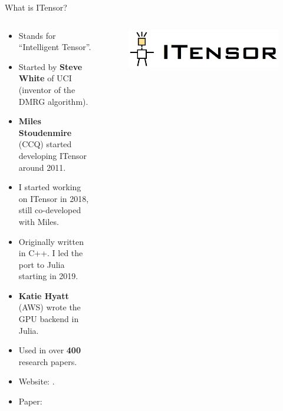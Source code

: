 \begin{frame}{What is ITensor?}

\begin{columns}

  \begin{column}[T]{0.7\textwidth}%

    \begin{itemize}[<+->]

      \item Stands for ``Intelligent Tensor''.
      \item Started by \textbf{Steve White} of UCI (inventor of the DMRG algorithm).
      \item \textbf{Miles Stoudenmire} (CCQ) started developing ITensor around 2011.
      \item I started working on ITensor in 2018, still co-developed with Miles.
      \item Originally written in C++. I led the port to Julia starting in 2019.
      \item \textbf{Katie Hyatt} (AWS) wrote the GPU backend in Julia.
      \item Used in over \textbf{400} research papers.
      \item Website: .
      \item Paper: 

    \end{itemize}

  \end{column}

  \begin{column}[T]{0.3\textwidth}%

    \begin{figure}[T]
      \includegraphics[width=1.0\textwidth]{
        slides/assets/what-is-itensor-itensor.jpg
      }
    \end{figure}

    \begin{columns}

      \begin{column}[T]{0.5\textwidth}%


\end{column}
\end{columns}
\end{column}
\end{columns}
\end{frame}
